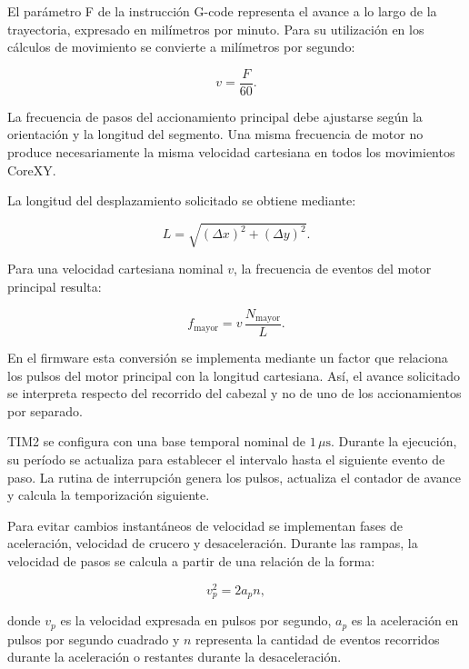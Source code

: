 \documentclass[blue,fullpaper]{ludusofficial}  %
\begin{document}
El parámetro F de la instrucción G-code representa
el avance a lo largo de la trayectoria, expresado
en milímetros por minuto. Para su utilización
en los cálculos de movimiento se convierte
a milímetros por segundo:

\begin{equation}
    v = \frac{F}{60}.
\end{equation}

La frecuencia de pasos del accionamiento principal
debe ajustarse según la orientación y la longitud
del segmento. Una misma frecuencia de motor no
produce necesariamente la misma velocidad cartesiana
en todos los movimientos CoreXY.

La longitud del desplazamiento solicitado se obtiene
mediante:

\begin{equation}
    L = \sqrt{(\Delta x)^2 + (\Delta y)^2}.
\end{equation}

Para una velocidad cartesiana nominal $v$, la
frecuencia de eventos del motor principal resulta:

\begin{equation}
    f_{\mathrm{mayor}} =
    v\,\frac{N_{\mathrm{mayor}}}{L}.
    \label{eq:frecuencia-corexy}
\end{equation}

En el firmware esta conversión se implementa
mediante un factor que relaciona los pulsos
del motor principal con la longitud cartesiana.
Así, el avance solicitado se interpreta respecto
del recorrido del cabezal y no de uno de los
accionamientos por separado.

TIM2 se configura con una base temporal nominal
de $1\,\mu\mathrm{s}$. Durante la ejecución,
su período se actualiza para establecer
el intervalo hasta el siguiente evento de paso.
La rutina de interrupción genera los pulsos,
actualiza el contador de avance y calcula
la temporización siguiente.

Para evitar cambios instantáneos de velocidad
se implementan fases de aceleración, velocidad
de crucero y desaceleración. Durante las rampas,
la velocidad de pasos se calcula a partir
de una relación de la forma:

\begin{equation}
    v_p^2 = 2a_p n,
\end{equation}

donde $v_p$ es la velocidad expresada en pulsos
por segundo, $a_p$ es la aceleración en pulsos
por segundo cuadrado y $n$ representa la cantidad
de eventos recorridos durante la aceleración
o restantes durante la desaceleración.
\end{document}

